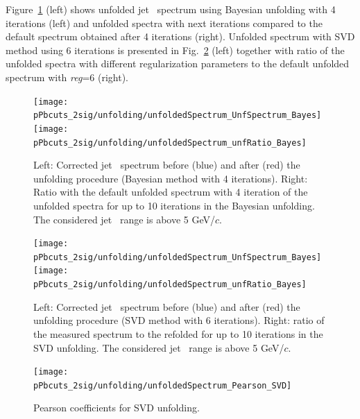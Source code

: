 Figure~\ref{fig:UnfSpec_pPb_Dzero_reg4} (left) shows unfolded jet \pt\ spectrum using Bayesian unfolding with 4 iterations (left) and unfolded spectra with next iterations compared to the default spectrum obtained after 4 iterations (right).
Unfolded spectrum with SVD method using 6 iterations is presented in Fig.~\ref{fig:UnfSpec_pPb_Dzero_SVD} (left) together with ratio of the unfolded spectra with different regularization parameters to the default unfolded spectrum with {\it reg}=6 (right).

\begin{figure}[bth]
\centering
\texttt{[image: pPbcuts\_2sig/unfolding/unfoldedSpectrum\_UnfSpectrum\_Bayes]}
\texttt{[image: pPbcuts\_2sig/unfolding/unfoldedSpectrum\_unfRatio\_Bayes]}
\caption{Left: Corrected jet \pt\ spectrum before (blue) and after (red) the unfolding procedure (Bayesian method with 4 iterations). Right: Ratio with the default unfolded spectrum with 4 iteration of the unfolded spectra for up to 10 iterations in the Bayesian unfolding. The considered jet \pt\ range is above 5 GeV/$c$.}
\label{fig:UnfSpec_pPb_Dzero_reg4}
\end{figure}

\begin{figure}[bth]
\centering
\texttt{[image: pPbcuts\_2sig/unfolding/unfoldedSpectrum\_UnfSpectrum\_Bayes]}
\texttt{[image: pPbcuts\_2sig/unfolding/unfoldedSpectrum\_unfRatio\_Bayes]}
\caption{Left: Corrected jet \pt\ spectrum before (blue) and after (red) the unfolding procedure (SVD method with 6 iterations). Right: ratio of the measured spectrum to the refolded for up to 10 iterations in the SVD unfolding. The considered jet \pt\ range is above 5 GeV/$c$.}
\label{fig:UnfSpec_pPb_Dzero_SVD}
\end{figure}


\begin{figure}[bth]
\centering
\texttt{[image: pPbcuts\_2sig/unfolding/unfoldedSpectrum\_Pearson\_SVD]}
\caption{Pearson coefficients for SVD unfolding.}
\label{fig:unfPearson_pPb_Dzero_SVD}
\end{figure}


